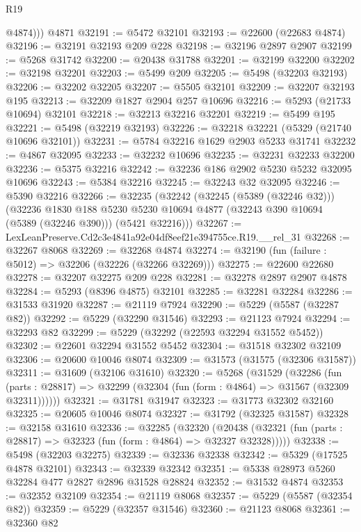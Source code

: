 \begin{lexlean}{R19}
\begin{coremodule}
          @4874)))
    @4871
@32191 := @5472 @32101
@32193 := @22600 (@22683 @4874)
@32196 := @32191 @32193 @209 @228
@32198 := @32196 @2897 @2907
@32199 := @5268 @31742
@32200 := @20438 @31788
@32201 := @32199 @32200
@32202 := @32198 @32201
@32203 := @5499 @209
@32205 := @5498 (@32203 @32193)
@32206 := @32202 @32205
@32207 := @5505 @32101
@32209 := @32207 @32193 @195
@32213 := @32209 @1827 @2904 @257 @10696
@32216 := @5293 (@21733 @10694) @32101
@32218 := @32213 @32216 @32201
@32219 := @5499 @195
@32221 := @5498 (@32219 @32193)
@32226 := @32218 @32221 (@5329 (@21740 @10696 @32101))
@32231 := @5784 @32216 @1629 @2903 @5233 @31741
@32232 := @4867 @32095
@32233 := @32232 @10696
@32235 := @32231 @32233 @32200
@32236 := @5375 @32216
@32242 := @32236 @186 @2902 @5230 @5232 @32095 @10696
@32243 := @5384 @32216
@32245 := @32243 @32 @32095
@32246 := @5390 @32216
@32266 := @32235
    (@32242
      (@32245 (@5389 (@32246 @32)))
      (@32236
        @1830
        @188
        @5230
        @5230
        @10694
        @4877
        (@32243 @390 @10694 (@5389 (@32246 @390)))
        (@5421 @32216)))
@32267 := LexLeanPreserve.Cd2c3e4841a92e04df8eef21e394755ce.R19.__rel_31
@32268 := @32267 @8068
@32269 := @32268 @4874
@32274 := @32190 (fun (failure : @5012) => @32206 (@32226 (@32266 @32269)))
@32275 := @22600 @22680
@32278 := @32207 @32275 @209 @228
@32281 := @32278 @2897 @2907 @4878
@32284 := @5293 (@8396 @4875) @32101
@32285 := @32281 @32284
@32286 := @31533 @31920
@32287 := @21119 @7924
@32290 := @5229 (@5587 (@32287 @82))
@32292 := @5229 (@32290 @31546)
@32293 := @21123 @7924
@32294 := @32293 @82
@32299 := @5229 (@32292 (@22593 @32294 @31552 @5452))
@32302 := @22601 @32294 @31552 @5452
@32304 := @31518 @32302 @32109
@32306 := @20600 @10046 @8074
@32309 := @31573 (@31575 (@32306 @31587))
@32311 := @31609 (@32106 @31610)
@32320 := @5268
    (@31529
      (@32286
        (fun (parts : @28817) => @32299 (@32304 (fun (form : @4864) => @31567 (@32309 @32311))))))
@32321 := @31781 @31947
@32323 := @31773 @32302 @32160
@32325 := @20605 @10046 @8074
@32327 := @31792 (@32325 @31587)
@32328 := @32158 @31610
@32336 := @32285
    (@32320
      (@20438 (@32321 (fun (parts : @28817) => @32323 (fun (form : @4864) => @32327 @32328)))))
@32338 := @5498 (@32203 @32275)
@32339 := @32336 @32338
@32342 := @5329 (@17525 @4878 @32101)
@32343 := @32339 @32342
@32351 := @5338 @28973 @5260 @32284 @477 @2827 @2896 @31528 @28824
@32352 := @31532 @4874
@32353 := @32352 @32109
@32354 := @21119 @8068
@32357 := @5229 (@5587 (@32354 @82))
@32359 := @5229 (@32357 @31546)
@32360 := @21123 @8068
@32361 := @32360 @82

\end{coremodule}
\end{lexlean}
